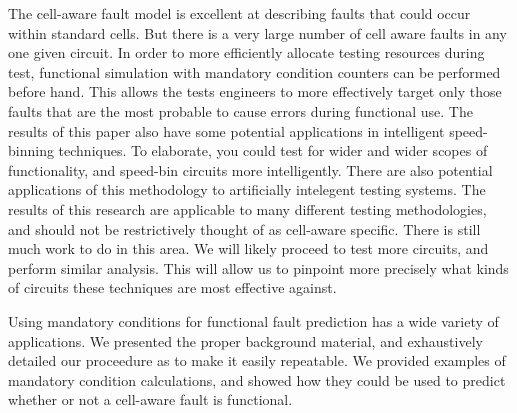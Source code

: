     \begin{comment}

    The prediction of fault importance will drastically shift the focus of most ATPG tools to allow for custom fault coverage levels. Another interesting possible application of this research is in regards to the estimation of fault coverage for parts of the circuit that are not tested using scan, but simply functional patterns. This latter application can apply to really any type of fault model not just cell-aware faults. In future work we plan to test the viability of this, and to also put safety bounds on how long we should run functional simulation, as well as testing this theory on other circuits and more extensively.  

    \end{comment}

    The cell-aware fault model is excellent at describing faults that could occur within standard cells. 
    But there is a very large number of cell aware faults in any one given circuit. 
    In order to more efficiently allocate testing resources during test, functional simulation with mandatory condition counters can be performed before hand. 
    This allows the tests engineers to more effectively target only those faults that are the most probable to cause errors during functional use. 
    The results of this paper also have some potential applications in intelligent speed-binning techniques. 
    To elaborate, you could test for wider and wider scopes of functionality, and speed-bin circuits more intelligently. 
    There are also potential applications of this methodology to artificially intelegent testing systems. 
    The results of this research are applicable to many different testing methodologies, and should not be restrictively thought of as cell-aware specific. 
    There is still much work to do in this area.
    We will likely proceed to test more circuits, and perform similar analysis.
    This will allow us to pinpoint more precisely what kinds of circuits these techniques are most effective against. 


    Using mandatory conditions for functional fault prediction has a wide variety of applications. 
    We presented the proper background material, and exhaustively detailed our proceedure as to make it easily repeatable. 
    We provided examples of mandatory condition calculations, and showed how they could be used to predict whether or not a cell-aware fault is functional.
    